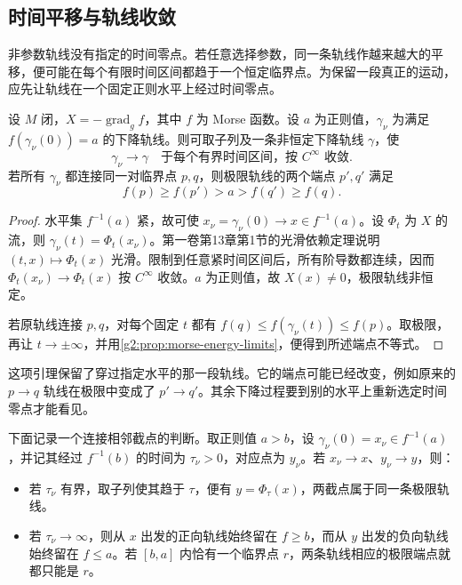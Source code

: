 \subsection{时间平移与轨线收敛}
\label{g2:subsec:1802:02}

非参数轨线没有指定的时间零点。若任意选择参数，同一条轨线作越来越大的平移，便可能在每个有限时间区间都趋于一个恒定临界点。为保留一段真正的运动，应先让轨线在一个固定正则水平上经过时间零点。

\begin{lemma}\label{g2:lem:anchored-trajectory-convergence}
	设 \(M\) 闭，\(X=-\operatorname{grad}_g f\)，其中 \(f\) 为 Morse 函数。设 \(a\) 为正则值，\(\gamma_\nu\) 为满足 \(f(\gamma_\nu(0))=a\) 的下降轨线。则可取子列及一条非恒定下降轨线 \(\gamma\)，使
	\[
		\gamma_\nu\longrightarrow\gamma
		\quad\text{于每个有界时间区间，按 }C^\infty\text{ 收敛}.
	\]
	若所有 \(\gamma_\nu\) 都连接同一对临界点 \(p,q\)，则极限轨线的两个端点 \(p',q'\) 满足
	\[
		f(p)\ge f(p')>a>f(q')\ge f(q).
	\]
\end{lemma}
\begin{proof}
	水平集 \(f^{-1}(a)\) 紧，故可使 \(x_\nu=\gamma_\nu(0)\to x\in f^{-1}(a)\)。设 \(\Phi_t\) 为 \(X\) 的流，则 \(\gamma_\nu(t)=\Phi_t(x_\nu)\)。第一卷第13章第1节的光滑依赖定理说明 \((t,x)\mapsto\Phi_t(x)\) 光滑。限制到任意紧时间区间后，所有阶导数都连续，因而 \(\Phi_t(x_\nu)\to\Phi_t(x)\) 按 \(C^\infty\) 收敛。\(a\) 为正则值，故 \(X(x)\ne0\)，极限轨线非恒定。

	若原轨线连接 \(p,q\)，对每个固定 \(t\) 都有 \(f(q)\le f(\gamma_\nu(t))\le f(p)\)。取极限，再让 \(t\to\pm\infty\)，并用\cref{g2:prop:morse-energy-limits}，便得到所述端点不等式。
\end{proof}

这项引理保留了穿过指定水平的那一段轨线。它的端点可能已经改变，例如原来的 \(p\to q\) 轨线在极限中变成了 \(p'\to q'\)。其余下降过程要到别的水平上重新选定时间零点才能看见。

\ProseParagraphBreak

下面记录一个连接相邻截点的判断。取正则值 \(a>b\)，设 \(\gamma_\nu(0)=x_\nu\in f^{-1}(a)\)，并记其经过 \(f^{-1}(b)\) 的时间为 \(\tau_\nu>0\)，对应点为 \(y_\nu\)。若 \(x_\nu\to x\)、\(y_\nu\to y\)，则：

\begin{itemize}
	\item 若 \(\tau_\nu\) 有界，取子列使其趋于 \(\tau\)，便有 \(y=\Phi_\tau(x)\)，两截点属于同一条极限轨线。
	\item 若 \(\tau_\nu\to\infty\)，则从 \(x\) 出发的正向轨线始终留在 \(f\ge b\)，而从 \(y\) 出发的负向轨线始终留在 \(f\le a\)。若 \([b,a]\) 内恰有一个临界点 \(r\)，两条轨线相应的极限端点就都只能是 \(r\)。
\end{itemize}

